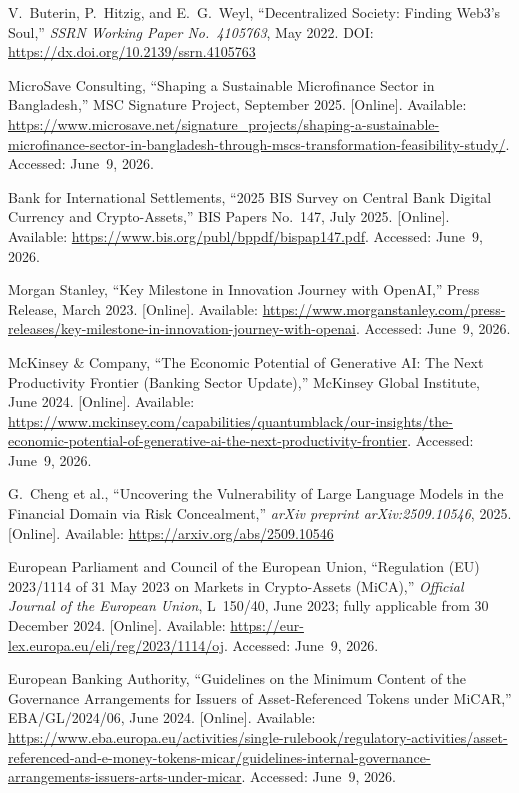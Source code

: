 \documentclass[12pt, a4paper]{report}
\begin{document}
{\begin{enumerate}[label={[\arabic*]}]
\item V.~Buterin, P.~Hitzig, and E.~G.~Weyl, ``Decentralized Society: Finding Web3's Soul,'' \textit{SSRN Working Paper No.~4105763}, May 2022. DOI: \url{https://dx.doi.org/10.2139/ssrn.4105763}

\item MicroSave Consulting, ``Shaping a Sustainable Microfinance Sector in Bangladesh,'' MSC Signature Project, September 2025. [Online]. Available: \url{https://www.microsave.net/signature_projects/shaping-a-sustainable-microfinance-sector-in-bangladesh-through-mscs-transformation-feasibility-study/}. Accessed: June~9, 2026.

\item Bank for International Settlements, ``2025 BIS Survey on Central Bank Digital Currency and Crypto-Assets,'' BIS Papers No.~147, July 2025. [Online]. Available: \url{https://www.bis.org/publ/bppdf/bispap147.pdf}. Accessed: June~9, 2026.

\item Morgan Stanley, ``Key Milestone in Innovation Journey with OpenAI,'' Press Release, March 2023. [Online]. Available: \url{https://www.morganstanley.com/press-releases/key-milestone-in-innovation-journey-with-openai}. Accessed: June~9, 2026.

\item McKinsey \& Company, ``The Economic Potential of Generative AI: The Next Productivity Frontier (Banking Sector Update),'' McKinsey Global Institute, June 2024. [Online]. Available: \url{https://www.mckinsey.com/capabilities/quantumblack/our-insights/the-economic-potential-of-generative-ai-the-next-productivity-frontier}. Accessed: June~9, 2026.

\item G.~Cheng et al., ``Uncovering the Vulnerability of Large Language Models in the Financial Domain via Risk Concealment,'' \textit{arXiv preprint arXiv:2509.10546}, 2025. [Online]. Available: \url{https://arxiv.org/abs/2509.10546}

\item European Parliament and Council of the European Union, ``Regulation (EU) 2023/1114 of 31 May 2023 on Markets in Crypto-Assets (MiCA),'' \textit{Official Journal of the European Union}, L~150/40, June 2023; fully applicable from 30 December 2024. [Online]. Available: \url{https://eur-lex.europa.eu/eli/reg/2023/1114/oj}. Accessed: June~9, 2026.

\item European Banking Authority, ``Guidelines on the Minimum Content of the Governance Arrangements for Issuers of Asset-Referenced Tokens under MiCAR,'' EBA/GL/2024/06, June 2024. [Online]. Available: \url{https://www.eba.europa.eu/activities/single-rulebook/regulatory-activities/asset-referenced-and-e-money-tokens-micar/guidelines-internal-governance-arrangements-issuers-arts-under-micar}. Accessed: June~9, 2026.


\end{enumerate}}
\end{document}
